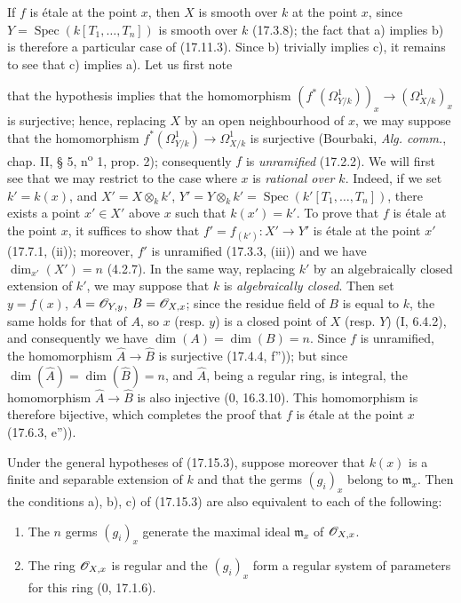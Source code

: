 If $f$ is étale at the point $x$, then $X$ is smooth over $k$ at the point $x$, since $Y=\operatorname{Spec}(k[T_1,\ldots,T_n])$ is smooth over $k$ (17.3.8); the fact that a) implies b) is therefore a particular case of (17.11.3). Since b) trivially implies c), it remains to see that c) implies a). Let us first note


that the hypothesis implies that the homomorphism $(f^*(\Omega^1_{Y/k}))_x\to(\Omega^1_{X/k})_x$ is surjective; hence, replacing $X$ by an open neighbourhood of $x$, we may suppose that the homomorphism $f^*(\Omega^1_{Y/k})\to\Omega^1_{X/k}$ is surjective (Bourbaki, \emph{Alg. comm.}, chap. II, § 5, n\textsuperscript{o} 1, prop. 2); consequently $f$ is \emph{unramified} (17.2.2). We will first see that we may restrict to the case where $x$ is \emph{rational over $k$}. Indeed, if we set $k'=k(x)$, and $X'=X\otimes_k k'$, $Y'=Y\otimes_k k'=\operatorname{Spec}(k'[T_1,\ldots,T_n])$, there exists a point $x'\in X'$ above $x$ such that $k(x')=k'$. To prove that $f$ is étale at the point $x$, it suffices to show that $f'=f_{(k')}:X'\to Y'$ is étale at the point $x'$ (17.7.1, (ii)); moreover, $f'$ is unramified (17.3.3, (iii)) and we have $\dim_{x'}(X')=n$ (4.2.7). In the same way, replacing $k'$ by an algebraically closed extension of $k'$, we may suppose that $k$ is \emph{algebraically closed}. Then set $y=f(x)$, $A=\mathscr{O}_{Y,y}$, $B=\mathscr{O}_{X,x}$; since the residue field of $B$ is equal to $k$, the same holds for that of $A$, so $x$ (resp. $y$) is a closed point of $X$ (resp. $Y$) (I, 6.4.2), and consequently we have $\dim(A)=\dim(B)=n$. Since $f$ is unramified, the homomorphism $\widehat A\to\widehat B$ is surjective (17.4.4, f'')); but since $\dim(\widehat A)=\dim(\widehat B)=n$, and $\widehat A$, being a regular ring, is integral, the homomorphism $\widehat A\to\widehat B$ is also injective (0, 16.3.10). This homomorphism is therefore bijective, which completes the proof that $f$ is étale at the point $x$ (17.6.3, e'')).

\begin{corollary}[17.15.4]
\label{IV.17.15.4}
Under the general hypotheses of (17.15.3), suppose moreover that $k(x)$ is a finite and separable extension of $k$ and that the germs $(g_i)_x$ belong to $\mathfrak m_x$. Then the conditions a), b), c) of (17.15.3) are also equivalent to each of the following:
\begin{enumerate}
  \item[d)] The $n$ germs $(g_i)_x$ generate the maximal ideal $\mathfrak m_x$ of $\mathscr{O}_{X,x}$.
  \item[d')] The ring $\mathscr{O}_{X,x}$ is regular and the $(g_i)_x$ form a regular system of parameters for this ring (0, 17.1.6).
\end{enumerate}
\end{corollary}

